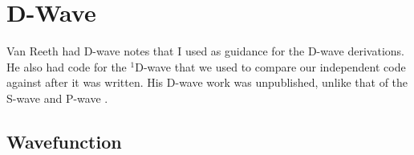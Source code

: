 \documentclass[Dissertation.tex]{subfiles}
\begin{document}
\chapter{D-Wave}
\label{chp:DWave}


Van Reeth \cite{VanReethPrivate} had D-wave notes that I used as guidance for
the D-wave derivations. He also had code for the $^1$D-wave that we used to
compare our independent code against after it was written. His D-wave work was
unpublished, unlike that of the S-wave and P-wave \cite{VanReeth2003,VanReeth2004}.


\section{Wavefunction}
\label{sec:DWaveFn}
\end{document}

